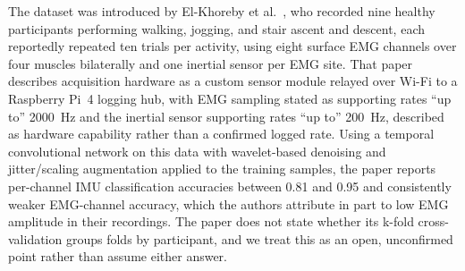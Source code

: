 \documentclass[conference]{IEEEtran}
\begin{document}
The dataset was introduced by El-Khoreby et
al.~\cite{el-khoreby2025sdalle}, who recorded nine healthy
participants performing walking, jogging, and stair ascent and
descent, each reportedly repeated ten trials per activity, using
eight surface EMG channels over four muscles bilaterally and one
inertial sensor per EMG site. That paper describes acquisition
hardware as a custom sensor module relayed over Wi-Fi to a Raspberry
Pi~4 logging hub, with EMG sampling stated as supporting rates
``up to'' 2000~Hz and the inertial sensor supporting rates ``up to''
200~Hz, described as hardware capability rather than a confirmed
logged rate. Using a temporal convolutional network on this data
with wavelet-based denoising and jitter/scaling augmentation applied
to the training samples, the paper reports per-channel IMU
classification accuracies between 0.81 and 0.95 and consistently
weaker EMG-channel accuracy, which the authors attribute in part to
low EMG amplitude in their recordings. The paper does not state
whether its k-fold cross-validation groups folds by participant, and
we treat this as an open, unconfirmed point rather than assume
either answer.
\end{document}
